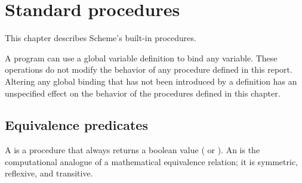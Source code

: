 
\chapter{Standard procedures}
\label{initialenv}
\label{builtinchapter}


This chapter describes Scheme's built-in procedures.  


A program can use a global variable definition to bind any variable.
These operations do not modify the behavior of
any procedure defined in this report. Altering any global binding that has
not been introduced by a definition has an unspecified effect on the
behavior of the procedures defined in this chapter.

\section{Equivalence predicates}
\label{equivalencesection}

A  is a procedure that always returns a boolean
value (\schtrue{} or \schfalse).  An  is
the computational analogue of a mathematical equivalence relation; it is
symmetric, reflexive, and transitive.


